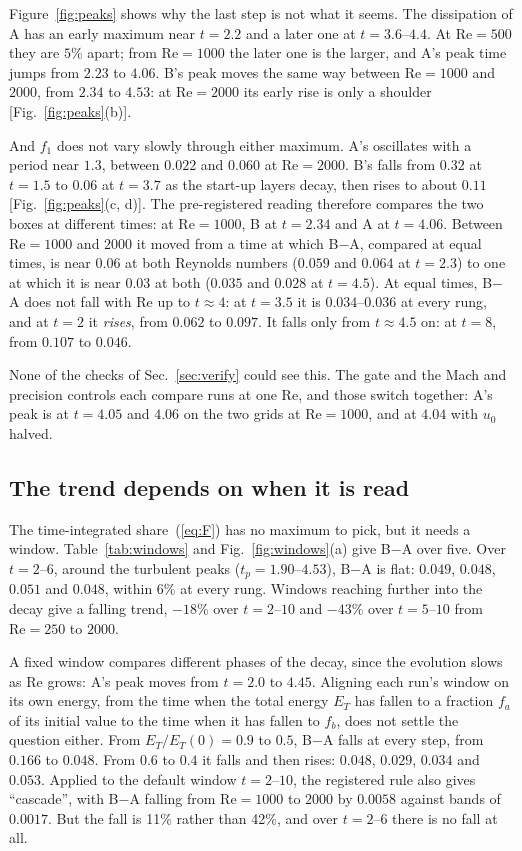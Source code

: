 \documentclass[aip,pop,reprint,amsmath,amssymb,superscriptaddress,floatfix]{revtex4-2}
\newcommand{\Rey}{\mathrm{Re}}
\begin{document}
Figure~\ref{fig:peaks} shows why the last step is not what it seems. The dissipation
of A has an early maximum near $t=2.2$ and a later one at $t=3.6$--$4.4$. At
$\Rey=500$ they are $5$\% apart; from $\Rey=1000$ the later one is the larger, and
A's peak time jumps from $2.23$ to $4.06$. B's peak moves the same way between
$\Rey=1000$ and $2000$, from $2.34$ to $4.53$: at $\Rey=2000$ its early rise is only a
shoulder [Fig.~\ref{fig:peaks}(b)].

And $f_1$ does not vary slowly through either maximum. A's oscillates with a period
near $1.3$, between $0.022$ and $0.060$ at $\Rey=2000$. B's falls from $0.32$ at
$t=1.5$ to $0.06$ at $t=3.7$ as the start-up layers decay, then rises to about $0.11$
[Fig.~\ref{fig:peaks}(c, d)]. The pre-registered reading therefore compares the two
boxes at different times: at $\Rey=1000$, B at $t=2.34$ and A at $t=4.06$. Between
$\Rey=1000$ and $2000$ it moved from a time at which B$-$A, compared at equal times, is
near $0.06$ at both Reynolds numbers ($0.059$ and $0.064$ at $t=2.3$) to one at which it
is near $0.03$ at both ($0.035$ and $0.028$ at $t=4.5$). At equal times, B$-$A does
not fall with $\Rey$ up to $t\approx4$: at $t=3.5$ it is $0.034$--$0.036$ at every
rung, and at $t=2$ it \emph{rises}, from $0.062$ to $0.097$. It falls only from
$t\approx4.5$ on: at $t=8$, from $0.107$ to $0.046$.

None of the checks of Sec.~\ref{sec:verify} could see this. The gate and the Mach and
precision controls each compare runs at one $\Rey$, and those switch together: A's
peak is at $t=4.05$ and $4.06$ on the two grids at $\Rey=1000$, and at $4.04$ with
$u_0$ halved.

\subsection{The trend depends on when it is read}
\label{sec:windows}

The time-integrated share~(\ref{eq:F}) has no maximum to pick, but it needs a window.
Table~\ref{tab:windows} and Fig.~\ref{fig:windows}(a) give B$-$A over five. Over
$t=2$--$6$, around the turbulent peaks ($t_p=1.90$--$4.53$), B$-$A is flat: $0.049$, $0.048$,
$0.051$ and $0.048$, within 6\% at every rung. Windows reaching further into the decay
give a falling trend, $-18$\% over $t=2$--$10$ and $-43$\% over $t=5$--$10$ from
$\Rey=250$ to $2000$.

A fixed window compares different phases of the decay, since the evolution slows as
$\Rey$ grows: A's peak moves from $t=2.0$ to $4.45$. Aligning each run's window on its
own energy, from the time when the total energy $E_T$ has fallen to a fraction $f_a$
of its initial value to the time when it has fallen to $f_b$, does not settle the
question either. From $E_T/E_T(0)=0.9$ to $0.5$, B$-$A falls at every step, from
$0.166$ to $0.048$. From $0.6$ to $0.4$ it falls and then rises: $0.048$, $0.029$,
$0.034$ and $0.053$. Applied to the default window $t=2$--$10$, the registered rule
also gives ``cascade'', with B$-$A falling from $\Rey=1000$ to $2000$ by $0.0058$
against bands of $0.0017$. But the fall is 11\% rather than 42\%, and over $t=2$--$6$
there is no fall at all.
\end{document}
